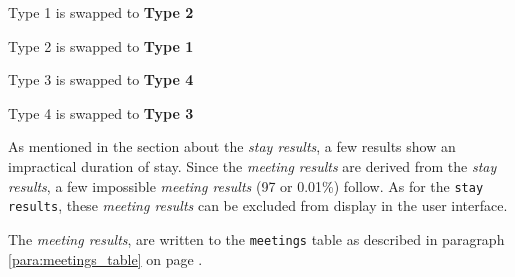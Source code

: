 \begin{mylist}
\item Type 1 is swapped to \textbf{Type 2}   
\item Type 2 is swapped to \textbf{Type 1}
\item Type 3 is swapped to \textbf{Type 4} 
\item Type 4 is swapped to \textbf{Type 3}
\end{mylist}

As mentioned in the section about the \textit{stay results}, a few results show an impractical duration of stay. Since the \textit{meeting results} are derived from the \textit{stay results}, a few impossible \textit{meeting results} (97 or 0.01\%) follow. As for the \lstinline|stay results|, these \textit{meeting results} can be excluded from display in the user interface.

The \textit{meeting results}, are written to the \lstinline|meetings| table as described in paragraph \ref{para:meetings_table} on page \pageref{para:meetings_table}. 

